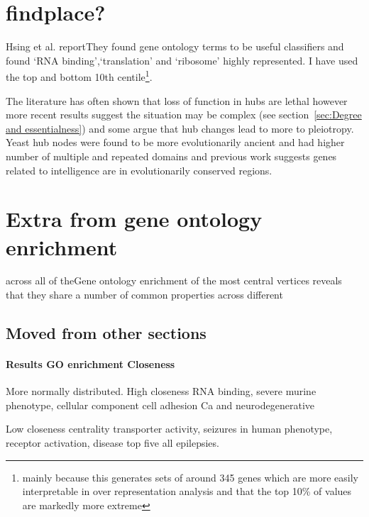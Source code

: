 \section{findplace?}
Hsing et al.\cite{hsing2008use} reportThey found gene ontology terms to be useful classifiers and found `RNA binding',`translation' and `ribosome' highly represented. I have used the top and bottom 10th centile\footnote{mainly because this generates sets of around 345 genes which are more easily interpretable in over representation analysis and that the top 10\% of values are markedly more extreme}.

The literature has often shown that loss of function in hubs are lethal \cite{jeong2001lethality} however more recent results suggest the situation may be complex (see section~\ref{sec:Degree and essentialness}) and some argue that hub changes lead to more to pleiotropy\cite{yu2008high}. Yeast hub nodes were found to be more evolutionarily ancient and had higher number of multiple and repeated domains\cite{ekman2006properties} and previous work suggests genes related to intelligence are in evolutionarily conserved regions\cite{hill2016molecular}. 

\section{Extra from gene ontology enrichment}





across all of theGene ontology enrichment of the most central vertices reveals that they share a number of common properties across different





\subsection{Moved from other sections}
\paragraph{Results GO enrichment Closeness}
More normally distributed.
High closeness RNA binding, severe murine phenotype, cellular component cell adhesion
Ca and neurodegenerative

Low closeness centrality transporter activity, seizures in human phenotype, receptor activation, disease top five all epilepsies. 

